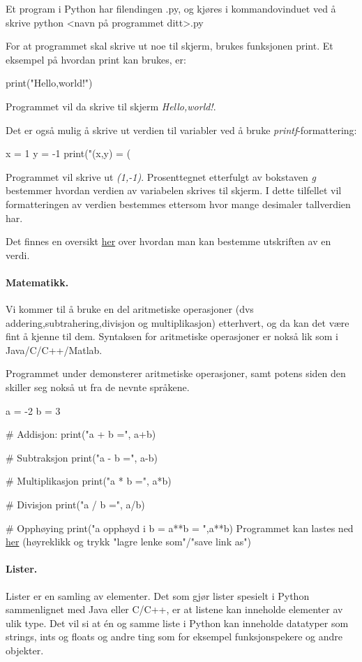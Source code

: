 \documentclass[%
oneside,                 %
final,                   %
10pt]{article}
\begin{document}
Et program i Python har filendingen .py, og kjøres i kommandovinduet ved å skrive
\bccq
python <navn på programmet ditt>.py
\eccq

For at programmet skal skrive ut noe til skjerm, brukes funksjonen print.
Et eksempel på hvordan print kan brukes, er:

\bpycod
print("Hello,world!")
\epycod

Programmet vil da skrive til skjerm \emph{Hello,world!}.

Det er også mulig å skrive ut verdien til variabler ved å bruke \emph{printf}-formattering:

\bpycod
x = 1
y = -1
print("(x,y) = (%
\epycod

Programmet vil skrive ut \emph{(1,-1)}. Prosenttegnet etterfulgt av bokstaven \emph{g} bestemmer hvordan verdien av variabelen skrives til skjerm.
I dette tilfellet vil formatteringen av verdien bestemmes ettersom hvor mange desimaler tallverdien har.

Det finnes en oversikt \href{{https://docs.python.org/2/library/stdtypes.html#string-formatting}}{her} over hvordan man kan bestemme utskriften av en verdi.


\paragraph{Matematikk.}
Vi kommer til å bruke en del aritmetiske operasjoner (dvs addering,subtrahering,divisjon og multiplikasjon) etterhvert, og da kan det være fint å kjenne til dem.
Syntaksen for aritmetiske operasjoner er nokså lik som i Java/C/C++/Matlab.


Programmet under demonsterer aritmetiske operasjoner, samt potens siden den skiller seg nokså ut fra de nevnte språkene.

\bpypro

a = -2
b = 3

# Addisjon:
print("a + b =", a+b)

# Subtraksjon
print("a - b =", a-b)

# Multiplikasjon
print("a * b =", a*b)

# Divisjon
print("a / b =", a/b)

# Opphøying
print("a opphøyd i b = a**b = ",a**b)
\epypro
Programmet kan lastes ned \href{{https://github.com/krisbhei/INF2310/raw/master/Programmering/Python/aritmetikk.py}}{her} (høyreklikk og trykk "lagre lenke som"/"save link as")

\paragraph{Lister.}
Lister er en samling av elementer. Det som gjør lister spesielt i Python sammenlignet med Java eller C/C++, er at listene kan inneholde elementer av ulik type.
Det vil si at én og samme liste i Python kan inneholde datatyper som strings, ints og floats og andre ting som for eksempel funksjonspekere og andre objekter.
\end{document}
